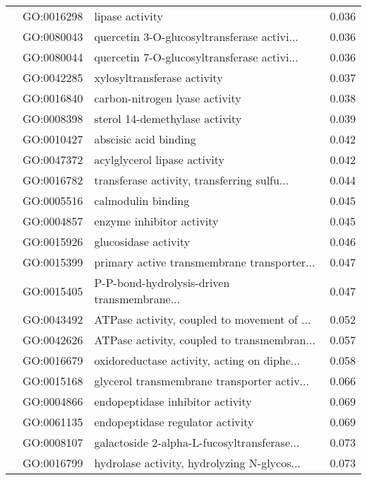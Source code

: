 \begin{longtable}{lllr}
   & GO:0016298 &                              lipase activity &         0.036 \\
   & GO:0080043 &  quercetin 3-O-glucosyltransferase activi... &         0.036 \\
   & GO:0080044 &  quercetin 7-O-glucosyltransferase activi... &         0.036 \\
   & GO:0042285 &                  xylosyltransferase activity &         0.037 \\
   & GO:0016840 &               carbon-nitrogen lyase activity &         0.038 \\
   & GO:0008398 &               sterol 14-demethylase activity &         0.039 \\
   & GO:0010427 &                        abscisic acid binding &         0.042 \\
   & GO:0047372 &                 acylglycerol lipase activity &         0.042 \\
   & GO:0016782 &  transferase activity, transferring sulfu... &         0.044 \\
   & GO:0005516 &                           calmodulin binding &         0.045 \\
   & GO:0004857 &                    enzyme inhibitor activity &         0.045 \\
   & GO:0015926 &                         glucosidase activity &         0.046 \\
   & GO:0015399 &  primary active transmembrane transporter... &         0.047 \\
   & GO:0015405 &  P-P-bond-hydrolysis-driven transmembrane... &         0.047 \\
   & GO:0043492 &  ATPase activity, coupled to movement of ... &         0.052 \\
   & GO:0042626 &  ATPase activity, coupled to transmembran... &         0.057 \\
   & GO:0016679 &  oxidoreductase activity, acting on diphe... &         0.058 \\
   & GO:0015168 &  glycerol transmembrane transporter activ... &         0.066 \\
   & GO:0004866 &             endopeptidase inhibitor activity &         0.069 \\
   & GO:0061135 &             endopeptidase regulator activity &         0.069 \\
   & GO:0008107 &  galactoside 2-alpha-L-fucosyltransferase... &         0.073 \\
   & GO:0016799 &  hydrolase activity, hydrolyzing N-glycos... &         0.073 \\

\end{longtable}
